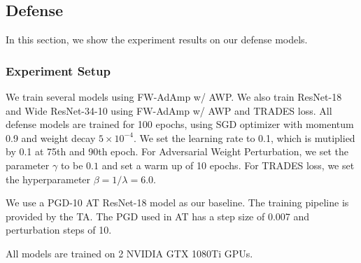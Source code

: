 \documentclass{article}
\begin{document}
    \subsection{Defense}\label{subs:DefenseExp}
        In this section, we show the experiment results on our defense models.
        \subsubsection{Experiment Setup}\label{subs:DefenseExpSetup}
            We train several models using FW-AdAmp w/ AWP. We also train ResNet-18 and Wide ResNet-34-10 using FW-AdAmp w/ AWP and TRADES loss. All defense models are trained for 100 epochs, using SGD optimizer with momentum 0.9 and weight decay $5\times 10^{-4}$. We set the learning rate to 0.1, which is mutiplied by 0.1 at 75th and 90th epoch. For Adversarial Weight Perturbation, we set the parameter $\gamma$ to be $0.1$ and set a warm up of 10 epochs. For TRADES loss, we set the hyperparameter $\beta = 1/\lambda = 6.0$.

            We use a PGD-10 AT ResNet-18 model as our baseline. The training pipeline is provided by the TA. The PGD used in AT has a step size of 0.007 and perturbation steps of 10. 

            All models are trained on 2 NVIDIA GTX 1080Ti GPUs.
\end{document}
